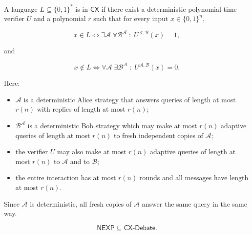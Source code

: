 \documentclass[11pt]{article}
\begin{document}
\begin{definition}
A language \(L \subseteq \{0,1\}^*\) is in \(\mathsf{CX}\) if there exist a deterministic polynomial-time verifier \(U\) and a polynomial \(r\) such that for every input \(x \in \{0,1\}^n\),

\[
x \in L
\iff
\exists \mathcal A \;\forall \mathcal B^{\mathcal A}\;:\;
U^{\mathcal A,\mathcal B}(x)=1,
\]

and

\[
x \notin L
\iff
\forall \mathcal A \;\exists \mathcal B^{\mathcal A}\;:\;
U^{\mathcal A,\mathcal B}(x)=0.
\]

Here:

\begin{itemize}
    \item \(\mathcal A\) is a deterministic Alice strategy that answers queries of length at most \(r(n)\) with replies of length at most \(r(n)\);
    \item \(\mathcal B^{\mathcal A}\) is a deterministic Bob strategy which may make at most \(r(n)\) adaptive queries of length at most \(r(n)\) to fresh independent copies of \(\mathcal A\);
    \item the verifier \(U\) may also make at most \(r(n)\) adaptive queries of length at most \(r(n)\) to \(\mathcal A\) and to \(\mathcal B\);
    \item the entire interaction has at most \(r(n)\) rounds and all messages have length at most \(r(n)\).
\end{itemize}

Since \(\mathcal A\) is deterministic, all fresh copies of \(\mathcal A\) answer the same query in the same way.
\end{definition}

\begin{theorem}
\[
\mathsf{NEXP}\subseteq \mathsf{CX\text{-}Debate}.
\]
\end{theorem}
\end{document}

